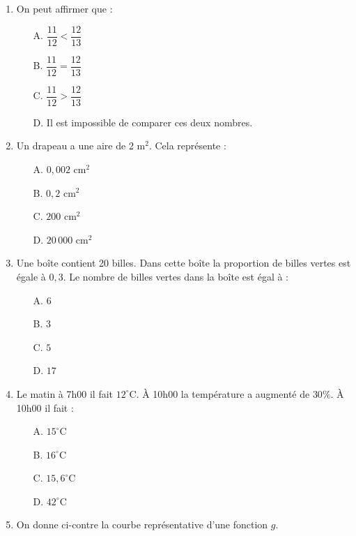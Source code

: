 \documentclass[a4paper,12pt]{article}
\begin{document}
\begin{enumerate}

\item On peut affirmer que :
\begin{itemize}
\item[A.] $\dfrac{11}{12} < \dfrac{12}{13}$
\item[B.] $\dfrac{11}{12} = \dfrac{12}{13}$
\item[C.] $\dfrac{11}{12} > \dfrac{12}{13}$
\item[D.] Il est impossible de comparer ces deux nombres.
\end{itemize}

\item Un drapeau a une aire de 2 m$^2$. Cela représente :
\begin{itemize}
\item[A.] $0,002$ cm$^2$
\item[B.] $0,2$ cm$^2$
\item[C.] $200$ cm$^2$
\item[D.] $20\,000$ cm$^2$
\end{itemize}

\item Une boîte contient 20 billes. Dans cette boîte la proportion de billes vertes est égale à $0,3$. Le nombre de billes vertes dans la boîte est égal à :
\begin{itemize}
\item[A.] $6$
\item[B.] $3$
\item[C.] $5$
\item[D.] $17$
\end{itemize}

\item Le matin à 7h00 il fait $12^\circ$C. À 10h00 la température a augmenté de $30\%$. À 10h00 il fait :
\begin{itemize}
\item[A.] $15^\circ$C
\item[B.] $16^\circ$C
\item[C.] $15,6^\circ$C
\item[D.] $42^\circ$C
\end{itemize}

\item On donne ci-contre la courbe représentative d'une fonction $g$.

\begin{center}
\end{center}
\end{enumerate}
\end{document}
